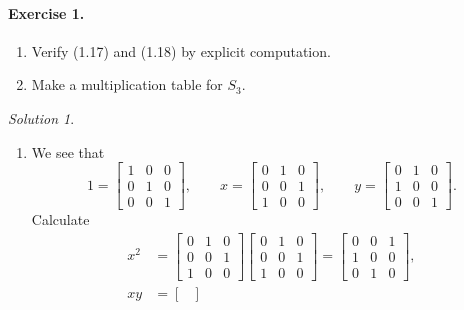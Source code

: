 \documentclass[11pt]{report}
\theoremstyle{remark}
\newtheorem*{solution}{Solution}
\begin{document}
    \paragraph{Exercise 1.} \mbox{}
    \begin{enumerate}
        \itemsep0em    
        \item Verify (1.17) and (1.18) by explicit computation.
        \item Make a multiplication table for $S_3$.
    \end{enumerate}
    \begin{solution} \mbox{}
        \begin{enumerate}
            \item We see that \[
                1 = \begin{bmatrix}
                    1 & 0 & 0 \\ 0 & 1 & 0 \\ 0 & 0 & 1
                \end{bmatrix}, \qquad
                x = \begin{bmatrix}
                    0 & 1 & 0 \\ 0 & 0 & 1 \\ 1 & 0 & 0
                \end{bmatrix}, \qquad
                y = \begin{bmatrix}
                    0 & 1 & 0 \\ 1 & 0 & 0 \\ 0 & 0 & 1
                \end{bmatrix}.
            \] Calculate \begin{align*}
                x^2 &= \begin{bmatrix}
                    0 & 1 & 0 \\ 0 & 0 & 1 \\ 1 & 0 & 0
                \end{bmatrix} \begin{bmatrix}
                    0 & 1 & 0 \\ 0 & 0 & 1 \\ 1 & 0 & 0
                \end{bmatrix} = \begin{bmatrix}
                    0 & 0 & 1 \\ 
                    1 & 0 & 0 \\
                    0 & 1 & 0
                \end{bmatrix}, \\
                xy &= \begin{bmatrix}

\end{bmatrix}
\end{align*}
\end{enumerate}
\end{solution}
\end{document}

